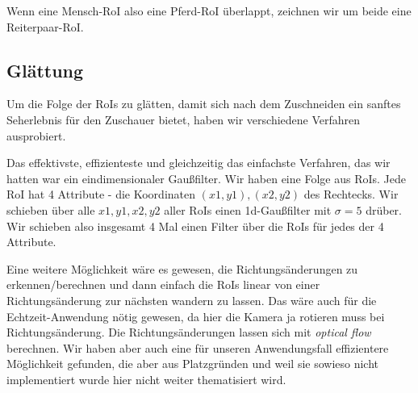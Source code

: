 Wenn eine Mensch-RoI also eine Pferd-RoI überlappt, zeichnen wir um beide eine Reiterpaar-RoI.

\subsection*{Glättung}
Um die Folge der RoIs zu glätten, damit sich nach dem Zuschneiden ein sanftes Seherlebnis für den Zuschauer bietet, haben wir verschiedene Verfahren ausprobiert.


Das effektivste, effizienteste und gleichzeitig das einfachste Verfahren, das wir hatten war ein eindimensionaler Gaußfilter.
Wir haben eine Folge aus RoIs.
Jede RoI hat 4 Attribute - die Koordinaten $(x1,y1), (x2,y2)$ des Rechtecks.
Wir schieben über alle $x1, y1, x2, y2$ aller RoIs einen 1d-Gaußfilter mit $\sigma=5$ drüber.
Wir schieben also insgesamt 4 Mal einen Filter über die RoIs für jedes der 4 Attribute.


Eine weitere Möglichkeit wäre es gewesen, die Richtungsänderungen zu erkennen/berechnen und dann einfach die RoIs linear von einer Richtungsänderung zur nächsten wandern zu lassen. Das wäre auch für die Echtzeit-Anwendung nötig gewesen, da hier die Kamera ja rotieren muss bei Richtungsänderung.
Die Richtungsänderungen lassen sich mit \emph{optical flow} berechnen.
Wir haben aber auch eine für unseren Anwendungsfall effizientere Möglichkeit gefunden, die aber aus Platzgründen und weil sie sowieso nicht implementiert wurde hier nicht weiter thematisiert wird.
